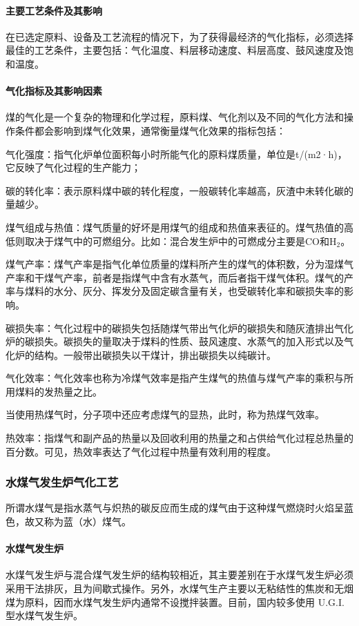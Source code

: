 \documentclass[10pt,openany]{ctexbook}
\begin{document}
\paragraph{主要工艺条件及其影响}
在已选定原料、设备及工艺流程的情况下，为了获得最经济的气化指标，必须选择最佳的工艺条件，主要包括：气化温度、料层移动速度、料层高度、鼓风速度及饱和温度。
\paragraph{气化指标及其影响因素}
煤的气化是一个复杂的物理和化学过程，原料煤、气化剂以及不同的气化方法和操作条件都会影响到煤气化效果，通常衡量煤气化效果的指标包括：\par
气化强度：指气化炉单位面积每小时所能气化的原料煤质量，单位是t/(m2·h)，它反映了气化过程的生产能力；\par
碳的转化率：表示原料煤中碳的转化程度，一般碳转化率越高，灰渣中未转化碳的量越少。\par
    煤气组成与热值：煤气质量的好坏是用煤气的组成和热值来表征的。煤气热值的高低则取决于煤气中的可燃组分。比如：混合发生炉中的可燃成分主要是CO和H$_2$。\par
    煤气产率：煤气产率是指气化单位质量的煤料所产生的煤气的体积数，分为湿煤气产率和干煤气产率，前者是指煤气中含有水蒸气，而后者指干煤气体积。煤气的产率与煤料的水分、灰分、挥发分及固定碳含量有关，也受碳转化率和碳损失率的影响。\par
  碳损失率：气化过程中的碳损失包括随煤气带出气化炉的碳损失和随灰渣排出气化炉的碳损失。碳损失的量取决于煤料的性质、鼓风速度、水蒸气的加入形式以及气化炉的结构。一般带出碳损失以干煤计，排出碳损失以纯碳计。\par
    气化效率：气化效率也称为冷煤气效率是指产生煤气的热值与煤气产率的乘积与所用煤料的发热量之比。\par
     当使用热煤气时，分子项中还应考虑煤气的显热，此时，称为热煤气效率。\par
 热效率：指煤气和副产品的热量以及回收利用的热量之和占供给气化过程总热量的百分数。可见，热效率表达了气化过程中热量有效利用的程度。
\subsubsection{水煤气发生炉气化工艺}
所谓水煤气是指水蒸气与炽热的碳反应而生成的煤气由于这种煤气燃烧时火焰呈蓝色，故又称为蓝（水）煤气。
\paragraph{水煤气发生炉}
 水煤气发生炉与混合煤气发生炉的结构较相近，其主要差别在于水煤气发生炉必须采用干法排灰，且为间歇式操作。另外，水煤气生产主要以无粘结性的焦炭和无烟煤为原料，因而水煤气发生炉内通常不设搅拌装置。目前，国内较多使用 U.G.I.型水煤气发生炉。
\end{document}
